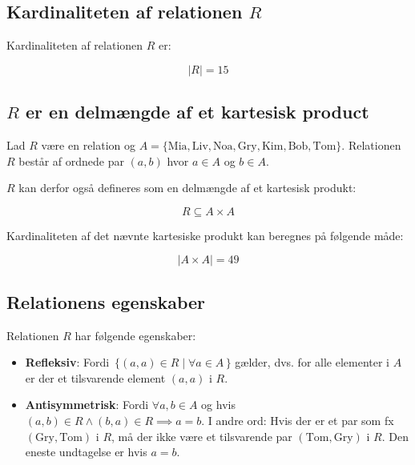 \subsection{Kardinaliteten af relationen \(R\)}\label{subsec:kardinaliteten-af-relationen-(r)}

Kardinaliteten af relationen \(R\) er:

\begin{equation}
    |R| = 15\label{eq:equation5}
\end{equation}

\subsection{\(R\) er en delmængde af et kartesisk product}\label{subsec:(r)-er-en-delmngde-af-et-kartesisk-product}

Lad \(R\) være en relation og \(A = \{\text{Mia}, \text{Liv}, \text{Noa}, \text{Gry}, \text{Kim}, \text{Bob},
\text{Tom}\}\).
Relationen \(R\) består af ordnede par \((a, b)\) hvor \(a \in A\) og \(b \in A\).

\(R\) kan derfor også defineres som en delmængde af et kartesisk produkt:

\begin{equation}
    R \subseteq A \times A\label{eq:equation3}
\end{equation}

Kardinaliteten af det nævnte kartesiske produkt kan beregnes på følgende måde:

\begin{equation}
    | A \times A | = 49\label{eq:equation4}
\end{equation}

\subsection{Relationens egenskaber}\label{subsec:relationens-egenskaber}

Relationen \(R\) har følgende egenskaber:

\begin{itemize}
    \item \textbf{Refleksiv}: Fordi \(\,\{(a, a) \in R \mid \forall a \in A\,\}\) gælder, dvs.
    for alle elementer i \(A\) er der et tilsvarende element \((a, a)\) i \(R\).
    \item \textbf{Antisymmetrisk}: Fordi \(\forall a, b \in A \) og hvis
    \((a, b) \in R \land (b, a) \in R \implies a = b\).
    I andre ord: Hvis der er et par som fx \((\text{Gry}, \text{Tom})\) i \(R\), må der ikke være et tilsvarende par
    \((\text{Tom}, \text{Gry})\) i \(R\).
    Den eneste undtagelse er hvis \(a = b\).
\end{itemize}

